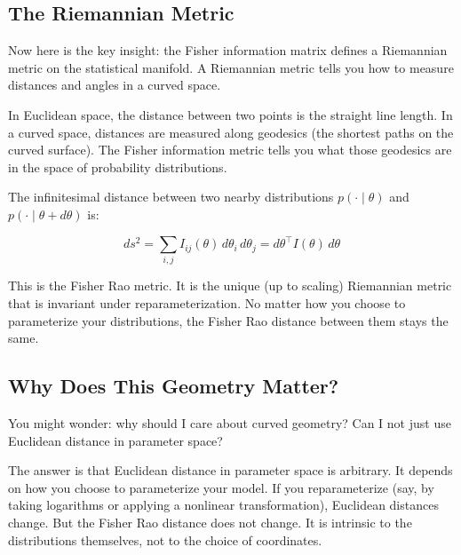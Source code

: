 \vspace{1.5em}

\subsection{The Riemannian Metric}

Now here is the key insight: the Fisher information matrix defines a Riemannian metric on the statistical manifold. A Riemannian metric tells you how to measure distances and angles in a curved space.

In Euclidean space, the distance between two points is the straight line length. In a curved space, distances are measured along geodesics (the shortest paths on the curved surface). The Fisher information metric tells you what those geodesics are in the space of probability distributions.

\vspace{1em}

The infinitesimal distance between two nearby distributions $p(\cdot \mid \theta)$ and $p(\cdot \mid \theta + d\theta)$ is:

\begin{equation}
ds^2 = \sum_{i,j} I_{ij}(\theta) \, d\theta_i \, d\theta_j = d\theta^\top I(\theta) \, d\theta
\end{equation}

This is the Fisher Rao metric. It is the unique (up to scaling) Riemannian metric that is invariant under reparameterization. No matter how you choose to parameterize your distributions, the Fisher Rao distance between them stays the same.

\vspace{1.5em}

\subsection{Why Does This Geometry Matter?}

You might wonder: why should I care about curved geometry? Can I not just use Euclidean distance in parameter space?

The answer is that Euclidean distance in parameter space is arbitrary. It depends on how you choose to parameterize your model. If you reparameterize (say, by taking logarithms or applying a nonlinear transformation), Euclidean distances change. But the Fisher Rao distance does not change. It is intrinsic to the distributions themselves, not to the choice of coordinates.

